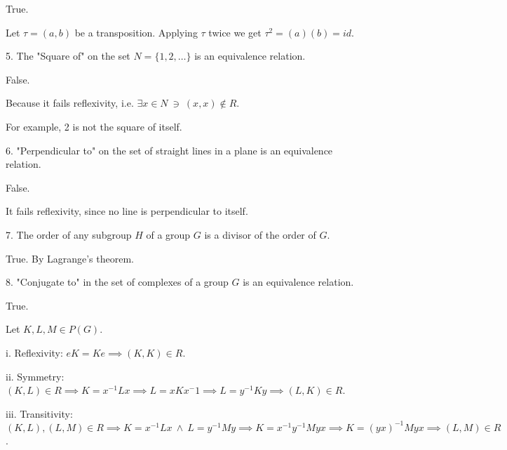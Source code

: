 \documentclass{article}
\begin{document}
True.

Let $\tau=(a,b)$ be a transposition. Applying $\tau$ twice we get $\tau^2 = (a)(b) = id$.
\newline

5. The "Square of" on the set $N=\{1,2,\ldots\}$ is an equivalence relation.

False.

Because it fails reflexivity, i.e. $\exists x \in N \ \ni \ (x,x) \notin R$. 

For example, 2 is not the square of itself.
\newline

6. "Perpendicular to" on the set of straight lines in a plane is an equivalence relation.

False.

It fails reflexivity, since no line is perpendicular to itself.


7. The order of any subgroup $H$ of a group $G$ is a divisor of the order of $G$.

True. By Lagrange's theorem.
\newline

8. "Conjugate to" in the set of complexes of a group $G$ is an equivalence relation.

True.

Let $K, L, M \in P(G)$.

\qquad i. Reflexivity: $eK = Ke \implies (K,K) \in R$.

\qquad ii. Symmetry: $(K,L) \in R \implies K = x^{-1}Lx \implies L = xKx^-1 \implies L = y^{-1}Ky \implies (L,K) \in R$.

\qquad iii. Transitivity: $(K,L), (L,M) \in R 
\implies K = x^{-1}Lx \ \land \ L = y^{-1}My
\implies K = x^{-1}y^{-1}Myx
\implies K = (yx)^{-1}Myx
\implies (L,M) \in R$.
\end{document}

